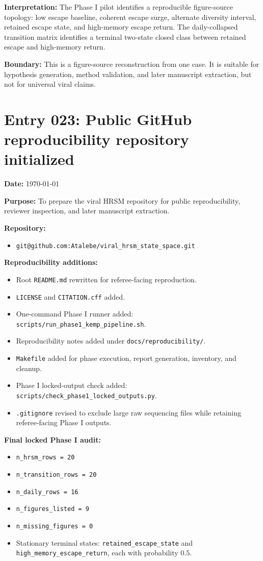 \textbf{Interpretation:} The Phase I pilot identifies a reproducible figure-source topology: low escape baseline, coherent escape surge, alternate diversity interval, retained escape state, and high-memory escape return. The daily-collapsed transition matrix identifies a terminal two-state closed class between retained escape and high-memory return.

\textbf{Boundary:} This is a figure-source reconstruction from one case. It is suitable for hypothesis generation, method validation, and later manuscript extraction, but not for universal viral claims.


\section*{Entry 023: Public GitHub reproducibility repository initialized}

\textbf{Date:} \today

\textbf{Purpose:} To prepare the viral HRSM repository for public reproducibility, reviewer inspection, and later manuscript extraction.

\textbf{Repository:}
\begin{itemize}
    \item \texttt{git@github.com:Atalebe/viral\_hrsm\_state\_space.git}
\end{itemize}

\textbf{Reproducibility additions:}
\begin{itemize}
    \item Root \texttt{README.md} rewritten for referee-facing reproduction.
    \item \texttt{LICENSE} and \texttt{CITATION.cff} added.
    \item One-command Phase I runner added: \texttt{scripts/run\_phase1\_kemp\_pipeline.sh}.
    \item Reproducibility notes added under \texttt{docs/reproducibility/}.
    \item \texttt{Makefile} added for phase execution, report generation, inventory, and cleanup.
    \item Phase I locked-output check added: \texttt{scripts/check\_phase1\_locked\_outputs.py}.
    \item \texttt{.gitignore} revised to exclude large raw sequencing files while retaining referee-facing Phase I outputs.
\end{itemize}

\textbf{Final locked Phase I audit:}
\begin{itemize}
    \item \texttt{n\_hrsm\_rows = 20}
    \item \texttt{n\_transition\_rows = 20}
    \item \texttt{n\_daily\_rows = 16}
    \item \texttt{n\_figures\_listed = 9}
    \item \texttt{n\_missing\_figures = 0}
    \item Stationary terminal states: \texttt{retained\_escape\_state} and \texttt{high\_memory\_escape\_return}, each with probability \(0.5\).
\end{itemize}


